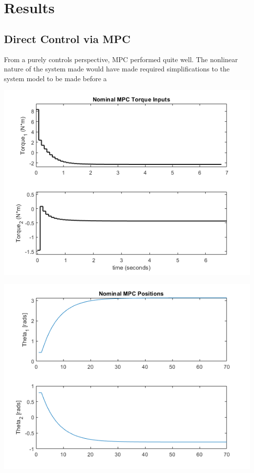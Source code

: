\documentclass[journal]{IEEEtran}
\begin{document}
\section{Results}

\subsection{Direct Control via MPC}

From a purely controls perspective, MPC performed quite well. The nonlinear nature of the system made would have made required simplifications to the system model to be made before a

\includegraphics[scale = 0.5]{../images/Nominal_MPC/T1_X_init_25_45_0_0_X_ref_180_n45_0_0/Torques}


\includegraphics[scale = 0.5]{../images/Nominal_MPC/T1_X_init_25_45_0_0_X_ref_180_n45_0_0/AngularPositions}
\end{document}
